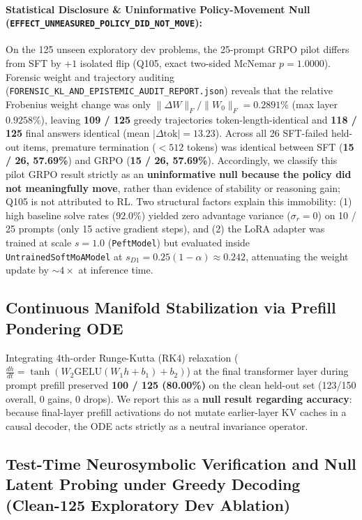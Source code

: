 \documentclass[11pt,a4paper]{article}
\begin{document}
\paragraph{Statistical Disclosure \& Uninformative Policy-Movement Null (\texttt{EFFECT\_UNMEASURED\_POLICY\_DID\_NOT\_MOVE}):}
On the 125 unseen exploratory dev problems, the 25-prompt GRPO pilot differs from SFT by $+1$ isolated flip (Q105, exact two-sided McNemar $p = 1.0000$). Forensic weight and trajectory auditing (\texttt{FORENSIC\_KL\_AND\_EPISTEMIC\_AUDIT\_REPORT.json}) reveals that the relative Frobenius weight change was only $\|\Delta W\|_F / \|W_0\|_F = 0.2891\%$ (max layer $0.9258\%$), leaving \textbf{109 / 125} greedy trajectories token-length-identical and \textbf{118 / 125} final answers identical (mean $|\Delta\text{tok}| = 13.23$). Across all 26 SFT-failed held-out items, premature termination ($<512$ tokens) was identical between SFT (\textbf{15 / 26, 57.69\%}) and GRPO (\textbf{15 / 26, 57.69\%}). Accordingly, we classify this pilot GRPO result strictly as an \textbf{uninformative null because the policy did not meaningfully move}, rather than evidence of stability or reasoning gain; Q105 is not attributed to RL. Two structural factors explain this immobility: (1) high baseline solve rates ($92.0\%$) yielded zero advantage variance ($\sigma_r = 0$) on 10 / 25 prompts (only 15 active gradient steps), and (2) the LoRA adapter was trained at scale $s=1.0$ (\texttt{PeftModel}) but evaluated inside \texttt{UntrainedSoftMoAModel} at $s_{D1} = 0.25(1-\alpha) \approx 0.242$, attenuating the weight update by $\sim 4\times$ at inference time.

\subsection{Continuous Manifold Stabilization via Prefill Pondering ODE}

Integrating 4th-order Runge-Kutta (RK4) relaxation ($\frac{dh}{dt} = \tanh(W_2 \mathrm{GELU}(W_1 h + b_1) + b_2)$) at the final transformer layer during prompt prefill preserved \textbf{100 / 125 (80.00\%)} on the clean held-out set (123/150 overall, 0 gains, 0 drops). We report this as a \textbf{null result regarding accuracy}: because final-layer prefill activations do not mutate earlier-layer KV caches in a causal decoder, the ODE acts strictly as a neutral invariance operator.

\subsection{Test-Time Neurosymbolic Verification and Null Latent Probing under Greedy Decoding (Clean-125 Exploratory Dev Ablation)}
\end{document}
